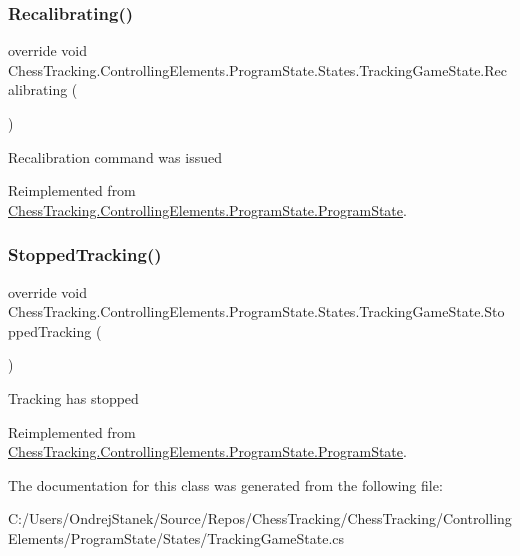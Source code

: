 \subsubsection{\texorpdfstring{Recalibrating()}{Recalibrating()}}
{\footnotesize\ttfamily override void Chess\+Tracking.\+Controlling\+Elements.\+Program\+State.\+States.\+Tracking\+Game\+State.\+Recalibrating (\begin{DoxyParamCaption}{ }\end{DoxyParamCaption})\hspace{0.3cm}{\ttfamily [virtual]}}



Recalibration command was issued 



Reimplemented from \mbox{\hyperlink{class_chess_tracking_1_1_controlling_elements_1_1_program_state_1_1_program_state_a702ebae08f0615d645dfaa4334ea62fc}{Chess\+Tracking.\+Controlling\+Elements.\+Program\+State.\+Program\+State}}.

\mbox{\label{class_chess_tracking_1_1_controlling_elements_1_1_program_state_1_1_states_1_1_tracking_game_state_a403e1536e7a40f736bc8d4b2e7c7aed1}} 
\subsubsection{\texorpdfstring{StoppedTracking()}{StoppedTracking()}}
{\footnotesize\ttfamily override void Chess\+Tracking.\+Controlling\+Elements.\+Program\+State.\+States.\+Tracking\+Game\+State.\+Stopped\+Tracking (\begin{DoxyParamCaption}{ }\end{DoxyParamCaption})\hspace{0.3cm}{\ttfamily [virtual]}}



Tracking has stopped 



Reimplemented from \mbox{\hyperlink{class_chess_tracking_1_1_controlling_elements_1_1_program_state_1_1_program_state_a0c86a45963ed8eb2b938f5d8f2d956ff}{Chess\+Tracking.\+Controlling\+Elements.\+Program\+State.\+Program\+State}}.



The documentation for this class was generated from the following file\+:\begin{DoxyCompactItemize}
\item 
C\+:/\+Users/\+Ondrej\+Stanek/\+Source/\+Repos/\+Chess\+Tracking/\+Chess\+Tracking/\+Controlling\+Elements/\+Program\+State/\+States/Tracking\+Game\+State.\+cs\end{DoxyCompactItemize}
